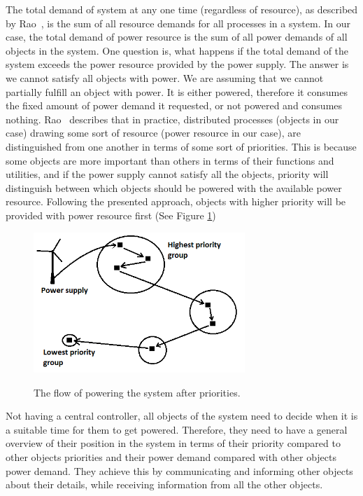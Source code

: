 \documentclass[letterpaper, 10 pt, conference]{ieeeconf}
\begin{document}
The total demand of system at any one time (regardless of resource), as described by Rao~\cite{rao2011foundation}, is the sum of all resource demands for all processes in a system. In our case, the total demand of power resource is the sum of all power demands of all objects in the system. One question is, what happens if the total demand of the system exceeds the power resource provided by the power supply. The answer is we cannot satisfy all objects with power. We are assuming that we cannot partially fulfill an object with power. It is either powered, therefore it consumes the fixed amount of power demand it requested, or not powered and consumes nothing. Rao~\cite{rao2011foundation} describes that in practice, distributed processes (objects in our case) drawing some sort of resource (power resource in our case), are distinguished from one another in terms of some sort of priorities. This is because some objects are more important than others in terms of their functions and utilities, and if the power supply cannot satisfy all the objects, priority will distinguish between which objects should be powered with the available power resource. Following the presented approach, objects with higher priority will be provided with power resource first (See Figure \ref{fig1})
\begin{figure}[h]
  \centering
  \includegraphics[width=80mm]{model.png}\\
  \caption{The flow of powering the system after priorities.}\label{fig1}
\end{figure}

Not having a central controller, all objects of the system need to decide when it is a suitable time for them to get powered. Therefore, they need to have a general overview of their position in the system in terms of their priority compared to other objects priorities and their power demand compared with other objects power demand. They achieve this by communicating and informing other objects about their details, while receiving information from all the other objects.
\end{document}
